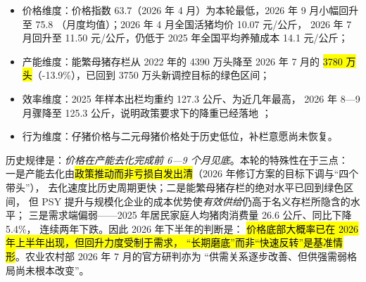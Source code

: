 \begin{itemize}
  \item 价格维度：价格指数 63.7（2026 年 4 月）为本轮最低，2026 年 9 月小幅回升至 75.8
  （月度均值）；2026 年 4 月全国活猪均价 10.07 元/公斤，
  2026 年 7 月回升至 11.50 元/公斤，仍低于 2025 年全国平均养殖成本
  14.1 元/公斤\cite{dxzq2026pig,jiemian2026pig,sun2026hog}；
  \item 产能维度：能繁母猪存栏从 2022 年的 4390 万头降至 2026 年 7 月的
  \hl{3780 万头}（-13.9\%），已回到 3750 万头新调控目标的绿色区间\cite{jiemian2026pig}；
  \item 效率维度：2025 年样本出栏均重约 127.3 公斤、为近几年最高，
  2026 年 8---9 月骤降至 125.3 公斤，说明政策要求下的降重已经落地
  \cite{stcn2026profit}；
  \item 行为维度：仔猪价格与二元母猪价格处于历史低位，补栏意愿尚未恢复。
\end{itemize}

历史规律是：\emph{价格在产能去化完成前 6---9 个月见底}。本轮的特殊性在于三点：
一是产能去化由\hl{政策推动而非亏损自发出清}（2026 年修订方案的目标下调与“四个带头”），
去化速度比历史周期更快；二是能繁母猪存栏的绝对水平已回到绿色区间，
但 PSY 提升与规模化企业的成本优势使\emph{有效供给}仍高于名义存栏所隐含的水平；
三是需求端偏弱——2025 年居民家庭人均猪肉消费量 26.6 公斤、同比下降 5.4\%，
连续两年下跌\cite{sun2026hog}。因此 2026 年下半年的判断是：
\hl{价格底部大概率已在 2026 年上半年出现，但回升力度受制于需求，
“长期磨底”而非“快速反转”是基准情形}。农业农村部 2026 年 7 月的官方研判亦为
“供需关系逐步改善、但供强需弱格局尚未根本改变”\cite{jiemian2026pig}。
